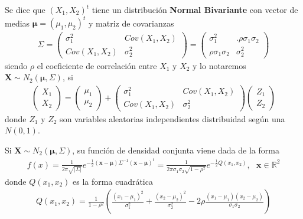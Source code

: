 \begin{defi}
Se dice que $(X_1,X_2)^t$ tiene un distribución \textbf{Normal Bivariante} con vector de medias $\boldsymbol{\mu} = (\mu_1,\mu_2)^t$ y matriz de covarianzas
\begin{align*}
    \Sigma =\left( \begin{matrix}
        \sigma_1^2 & Cov(X_1,X_2)\\
        Cov(X_1,X_2) & \sigma_2^2
\end{matrix}
\right) = \left( \begin{matrix}
        \sigma_1^2 & .\rho \sigma_1\sigma_2\\
        \rho \sigma_1\sigma_2 & \sigma_2^2
\end{matrix}
\right)
\end{align*}
siendo $\rho$ el coeficiente de correlación entre $X_1$ y $X_2$ y lo notaremos $\textbf{X} \sim N_2(\boldsymbol{\mu}, \Sigma)$, si
\begin{align*}
    \left( \begin{matrix}
        X_1\\
        X_2
\end{matrix}
\right) = \left( \begin{matrix}
        \mu_1\\
        \mu_2
\end{matrix}
\right) + \left( \begin{matrix}
        \sigma_1^2 & Cov(X_1,X_2)\\
        Cov(X_1,X_2) & \sigma_2^2
\end{matrix}
\right)\left( \begin{matrix}
        Z_1\\
        Z_2
\end{matrix}
\right) 
\end{align*}
donde $Z_1$ y $Z_2$ son variables aleatorias independientes distribuidad según una $N(0,1)$.
\end{defi}
Si $\textbf{X} \sim N_2(\boldsymbol{\mu}, \Sigma)$, su función de densidad conjunta viene dada de la forma
\begin{align*}
    f(x) = \frac{1}{2\pi\sqrt{|\Sigma|}}e^{-\frac{1}{2}(\textbf{x} - \boldsymbol{\mu})\Sigma^{-1}(\textbf{x} - \boldsymbol{\mu})^t} = \frac{1}{2\pi\sigma_1\sigma_2\sqrt{1 - \rho^2}}e^{-\frac{1}{2}Q(x_1,x_2)}, \ \ \ \textbf{x} \in \mathbb{R}^2
\end{align*}
donde $Q(x_1,x_2)$ es la forma cuadrática
\begin{align*}
    Q(x_1,x_2) = \frac{1}{1 - \rho^2}\left( \frac{(x_1 - \mu_1)^2}{\sigma_1^2} + \frac{(x_2 - \mu_2)^2}{\sigma_2^2} - 2\rho\frac{(x_1 - \mu_1)(x_2 - \mu_2)}{\sigma_1\sigma_2}\right)
\end{align*}

